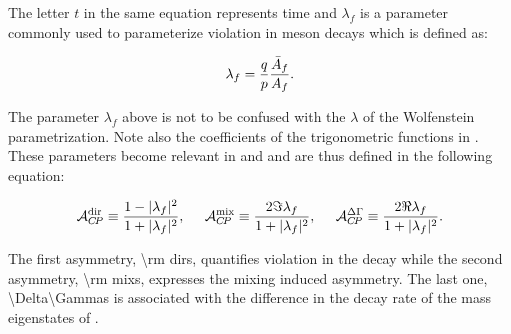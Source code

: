 The letter $t$ in the same equation represents time and $\lambda_f$ is a parameter commonly used to parameterize
\CP violation in meson decays which is defined as:

\begin{equation}
  \centering
  \lambda_{f} = \frac{q}{p} \frac{\bar{A}_f}{A_f}. %
\label{lambda_cpv}
\end{equation}

\noindent The parameter $\lambda_f$ above is not to be confused with the $\lambda$ of the
Wolfenstein parametrization. Note also the coefficients of the trigonometric functions in
. These parameters become relevant in 
and  and are thus defined in the following equation:

\begin{equation}
  \centering
  \Acp{\rm dir}      \equiv \frac{ 1-|\lambda_f|^2} {1 + |\lambda_f|^2},\;\;\;\;\;
  \Acp{\rm mix}      \equiv \frac{ 2 \Im\lambda_f} {1 + |\lambda_f|^2},\;\;\;\;\;
  \Acp{\Delta\Gamma} \equiv \frac{ 2 \Re\lambda_f} {1 + |\lambda_f|^2}.
\label{cp_asym_lambda}
\end{equation}

\noindent The first asymmetry, \Acp{\rm dir}, quantifies \CP violation in the decay while the
second asymmetry, \Acp{\rm mix}, expresses the mixing induced \CP asymmetry. The last one,
\Acp{\Delta\Gamma} is associated with the difference in the decay rate of the mass eigenstates of .
